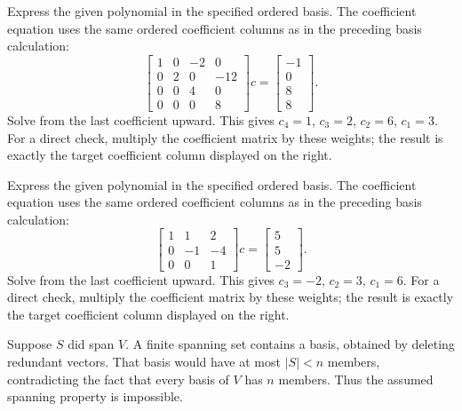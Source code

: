 \goal Express the given polynomial in the specified ordered basis.
The coefficient equation uses the same ordered coefficient columns as in the preceding basis calculation:
\[\left[\begin{array}{rrrr}1&0&-2&0\\0&2&0&-12\\0&0&4&0\\0&0&0&8\end{array}\right]c=\left[\begin{array}{r}-1\\0\\8\\8\end{array}\right].\]
Solve from the last coefficient upward. This gives $c_{4}=1$, $c_{3}=2$, $c_{2}=6$, $c_{1}=3$.
For a direct check, multiply the coefficient matrix by these weights; the result is exactly the target coefficient column displayed on the right.

\goal Express the given polynomial in the specified ordered basis.
The coefficient equation uses the same ordered coefficient columns as in the preceding basis calculation:
\[\left[\begin{array}{rrr}1&1&2\\0&-1&-4\\0&0&1\end{array}\right]c=\left[\begin{array}{r}5\\5\\-2\end{array}\right].\]
Solve from the last coefficient upward. This gives $c_{3}=-2$, $c_{2}=3$, $c_{1}=6$.
For a direct check, multiply the coefficient matrix by these weights; the result is exactly the target coefficient column displayed on the right.

Suppose $S$ did span $V$. A finite spanning set contains a basis,
obtained by deleting redundant vectors. That basis would have at most
$|S|<n$ members, contradicting the fact that every basis of $V$ has
$n$ members. Thus the assumed spanning property is impossible.

